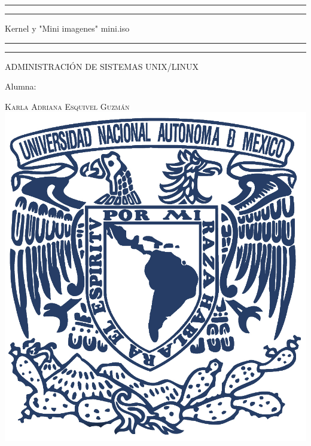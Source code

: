 \documentclass[a4paper, 11pt, oneside]{article}
\begin{document}
 

\begin{titlepage} 

	\centering 
	
	\scshape 
	
	\vspace*{\baselineskip} 
	
	
	
	\rule{\textwidth}{1.6pt}\vspace*{-\baselineskip}\vspace*{2pt} 
	\rule{\textwidth}{0.4pt} 
	
	\vspace{0.75\baselineskip} 
	
	{\LARGE Kernel y "Mini imagenes" mini.iso}	
	\vspace{0.75\baselineskip} 
	
	\rule{\textwidth}{0.4pt}\vspace*{-\baselineskip}\vspace{3.2pt}
	\rule{\textwidth}{1.6pt} 
	
	\vspace{2\baselineskip} 
	

	ADMINISTRACIÓN DE SISTEMAS UNIX/LINUX
	
	\vspace*{3\baselineskip} 
	
	
	
	Alumna:
	
	\vspace{0.5\baselineskip} 
	
	{\scshape\Large Karla Adriana Esquivel Guzmán \\} 
	\vspace{0.5\baselineskip} 
	\vfill
	\includegraphics{unam.jpg}
	

\end{titlepage}
\end{document}
